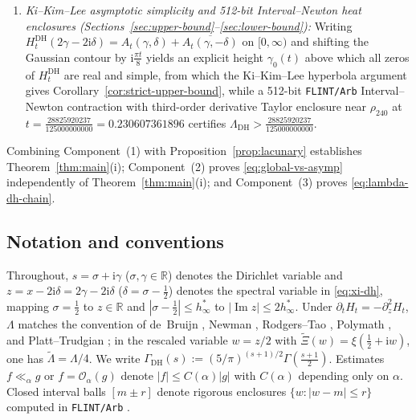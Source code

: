 \documentclass[11pt,a4paper,reqno]{amsart}
\theoremstyle{definition}
\theoremstyle{remark}
\numberwithin{equation}{section}
\newcommand{\R}{\mathbb{R}}
\newcommand{\ii}{\mathrm{i}}
\DeclareMathOperator{\Imop}{Im}
\begin{document}
\begin{enumerate}[label=\textup{(\arabic*)},leftmargin=2.2em]
  \item \emph{Ki--Kim--Lee asymptotic simplicity and 512-bit Interval--Newton heat enclosures (Sections~\ref{sec:upper-bound}--\ref{sec:lower-bound}):} Writing $H_t^{\mathrm{DH}}(2\gamma - 2\ii\delta) = A_t(\gamma,\delta) + \overline{A_t(\gamma,-\delta)}$ on $[0,\infty)$ and shifting the Gaussian contour by $\ii\frac{\pi t}{8}$ yields an explicit height $\gamma_0(t)$ above which all zeros of $H_t^{\mathrm{DH}}$ are real and simple, from which the Ki--Kim--Lee hyperbola argument \cite{kikimlee2009,debruijn1950} gives Corollary~\ref{cor:strict-upper-bound}, while a 512-bit \texttt{FLINT/Arb} Interval--Newton contraction with third-order derivative Taylor enclosure near $\rho_{240}$ at $t = \frac{28825920237}{125000000000} = 0.230607361896$ certifies $\Lambda_{\mathrm{DH}} > \frac{28825920237}{125000000000}$.
\end{enumerate}

Combining Component~(1) with Proposition~\ref{prop:lacunary} establishes Theorem~\ref{thm:main}(i); Component~(2) proves \eqref{eq:global-vs-asymp} independently of Theorem~\ref{thm:main}(i); and Component~(3) proves \eqref{eq:lambda-dh-chain}.

\subsection{Notation and conventions}
\label{subsec:notation}

Throughout, $s = \sigma + \ii\gamma$ ($\sigma,\gamma \in \R$) denotes the Dirichlet variable and $z = x - 2\ii\delta = 2\gamma - 2\ii\delta$ ($\delta = \sigma - \frac{1}{2}$) denotes the spectral variable in \eqref{eq:xi-dh}, mapping $\sigma = \frac{1}{2}$ to $z \in \R$ and $|\sigma - \frac{1}{2}| \le h_\infty^*$ to $|\Imop z| \le 2h_\infty^*$. Under $\partial_t H_t = -\partial_z^2 H_t$, $\Lambda$ matches the convention of de~Bruijn \cite{debruijn1950}, Newman \cite{newman1976}, Rodgers--Tao \cite{rodgerstao2020}, Polymath \cite{polymath2019}, and Platt--Trudgian \cite{platt2021}; in the rescaled variable $w = z/2$ with $\widetilde{\Xi}(w) = \xi(\frac{1}{2}+\ii w)$, one has $\widetilde{\Lambda} = \Lambda/4$. We write $\Gamma_{\mathrm{DH}}(s) := (5/\pi)^{(s+1)/2}\Gamma(\frac{s+1}{2})$. Estimates $f \ll_\alpha g$ or $f = \mathcal{O}_\alpha(g)$ denote $|f| \le C(\alpha)|g|$ with $C(\alpha)$ depending only on $\alpha$. Closed interval balls $[m \pm r]$ denote rigorous enclosures $\{w : |w - m| \le r\}$ computed in \texttt{FLINT/Arb} \cite{johansson2017}.
\end{document}
